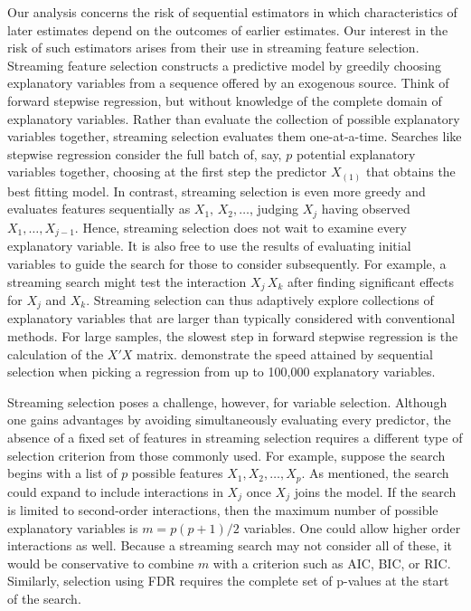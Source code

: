 \documentclass[12pt]{article}
\begin{document}
 Our analysis concerns the risk of sequential estimators in which
 characteristics of later estimates depend on the outcomes of earlier estimates.
  Our interest in the risk of such estimators arises from their use in streaming
 feature selection.  Streaming feature selection constructs a predictive model
 by greedily choosing explanatory variables from a sequence offered by an exogenous
 source.  Think of forward stepwise regression, but without knowledge of the
 complete domain of explanatory variables.  Rather than evaluate the collection of possible
 explanatory variables together, streaming selection evaluates them
 one-at-a-time.  Searches like stepwise regression consider the full
 batch of, say, $p$ potential explanatory variables together, choosing at the
 first step the predictor $X_{(1)}$ that obtains the best fitting model.  In
 contrast, streaming selection is even more greedy and evaluates features 
 sequentially as $X_1, \, X_2, \ldots$, judging $X_j$ having observed
 $X_1, \ldots, X_{j-1}$.  Hence, streaming selection does not
 wait to examine every explanatory variable.  It is also free to use 
 the results of evaluating initial variables to guide the search for
 those to consider subsequently.  For example, a streaming search might test the
 interaction $X_j \, X_k$ after finding significant effects for $X_j$ and $X_k$.
  Streaming selection can thus adaptively explore collections of explanatory
 variables that are larger than typically considered with conventional methods.
 For large samples, the slowest step in forward stepwise regression is the
 calculation of the $X'X$ matrix.  \citet{fosterlin11} demonstrate the speed
 attained by sequential selection when picking a regression from up to 100,000
 explanatory variables.


 Streaming selection poses a challenge, however, for variable selection.
  Although one gains advantages by avoiding simultaneously evaluating every
 predictor, the absence of a fixed set of features in streaming selection
 requires a different type of selection criterion from those commonly used.  For
 example, suppose the search begins with a list of $p$ possible features $X_1,
 X_2, \ldots, X_p$.  As mentioned, the search could expand to include
 interactions in $X_j$ once $X_j$ joins the model.  If the search is limited to
 second-order interactions, then the maximum number of possible explanatory
 variables is $m = p(p+1)/2$ variables.  One could allow higher order
 interactions as well.  Because a streaming search may not consider all of
 these, it would be conservative to combine $m$ with a criterion such as AIC,
 BIC, or RIC.  Similarly, selection using FDR requires the complete set of
 p-values at the start of the search.
\end{document}
